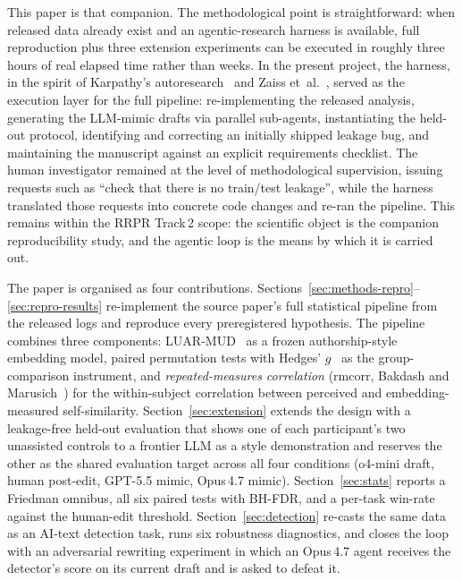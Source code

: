 \documentclass[runningheads]{llncs}
\begin{document}
This paper is that companion. The methodological point is
straightforward: when released data already exist and an
agentic-research harness is available, full reproduction plus three
extension experiments can be executed in roughly three hours of real
elapsed time rather than weeks. In the present project, the harness,
in the spirit of
Karpathy's autoresearch~\cite{karpathy2026autoresearch} and
Zaiss et~al.~\cite{zaiss2026agent4mr}, served as the execution layer
for the full pipeline: re-implementing the released analysis,
generating the LLM-mimic drafts via parallel sub-agents,
instantiating the held-out protocol, identifying and correcting an
initially shipped leakage bug, and maintaining the manuscript
against an explicit requirements checklist. The human investigator
remained at the level of methodological supervision, issuing
requests such as ``check that there is no train/test leakage'',
while the harness translated those requests into concrete code
changes and re-ran the pipeline. This remains within the RRPR
Track\,2 scope: the scientific object is the companion
reproducibility study, and the agentic loop is the means by which
it is carried out.

The paper is organised as four contributions.
Sections~\ref{sec:methods-repro}--\ref{sec:repro-results} re-implement
the source paper's full statistical pipeline from the released logs
and reproduce every preregistered hypothesis. The pipeline combines
three components: LUAR-MUD~\cite{rivera2021luar} as a frozen
authorship-style embedding model, paired permutation tests with
Hedges' $g$~\cite{hedges1981} as the group-comparison instrument, and
\emph{repeated-measures correlation} (rmcorr,
Bakdash and Marusich~\cite{bakdash2017rmcorr}) for the within-subject
correlation between perceived and embedding-measured self-similarity. Section~\ref{sec:extension} extends the design with a
leakage-free held-out evaluation that shows one of each
participant's two unassisted controls to a frontier LLM as a style
demonstration and reserves the other as the shared evaluation target
across all four conditions (o4-mini draft, human post-edit, GPT-5.5
mimic, Opus\,4.7 mimic). Section~\ref{sec:stats} reports a Friedman
omnibus, all six paired tests with BH-FDR, and a per-task win-rate
against the human-edit threshold. Section~\ref{sec:detection}
re-casts the same data as an AI-text detection task, runs six
robustness diagnostics, and closes the loop with an adversarial
rewriting experiment in which an Opus\,4.7 agent receives the
detector's score on its current draft and is asked to defeat it.
\end{document}
